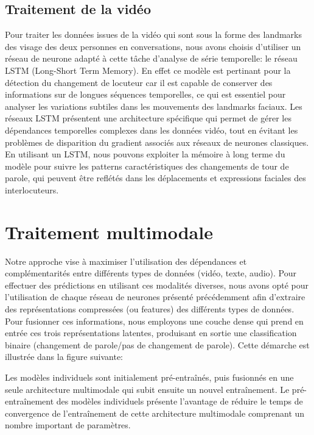 \documentclass[a4paper]{article}
\begin{document}
\subsection{Traitement de la vidéo}

Pour traiter les données issues de la vidéo qui sont sous la forme des landmarks des visage des deux personnes en conversations, nous avons choisis d'utiliser un réseau de neurone adapté à cette tâche d'analyse de série temporelle: le réseau LSTM (Long-Short Term Memory). En effet ce modèle est pertinant pour la détection du changement de locuteur car il est capable de conserver des informations sur de longues séquences temporelles, ce qui est essentiel pour analyser les variations subtiles dans les mouvements des landmarks faciaux. Les réseaux LSTM présentent une architecture spécifique qui permet de gérer les dépendances temporelles complexes dans les données vidéo, tout en évitant les problèmes de disparition du gradient associés aux réseaux de neurones classiques. En utilisant un LSTM, nous pouvons exploiter la mémoire à long terme du modèle pour suivre les patterns caractéristiques des changements de tour de parole, qui peuvent être reflétés dans les déplacements et expressions faciales des interlocuteurs.

\section{Traitement multimodale}


Notre approche vise à maximiser l'utilisation des dépendances et complémentarités entre différents types de données (vidéo, texte, audio). Pour effectuer des prédictions en utilisant ces modalités diverses, nous avons opté pour l'utilisation de chaque réseau de neurones présenté précédemment afin d'extraire des représentations compressées (ou features) des différents types de données. Pour fusionner ces informations, nous employons une couche dense qui prend en entrée ces trois représentations latentes, produisant en sortie une classification binaire (changement de parole/pas de changement de parole). Cette démarche est illustrée dans la figure suivante:

Les modèles individuels sont initialement pré-entraînés, puis fusionnés en une seule architecture multimodale qui subit ensuite un nouvel entraînement. Le pré-entraînement des modèles individuels présente l'avantage de réduire le temps de convergence de l'entraînement de cette architecture multimodale comprenant un nombre important de paramètres. 
\end{document}

